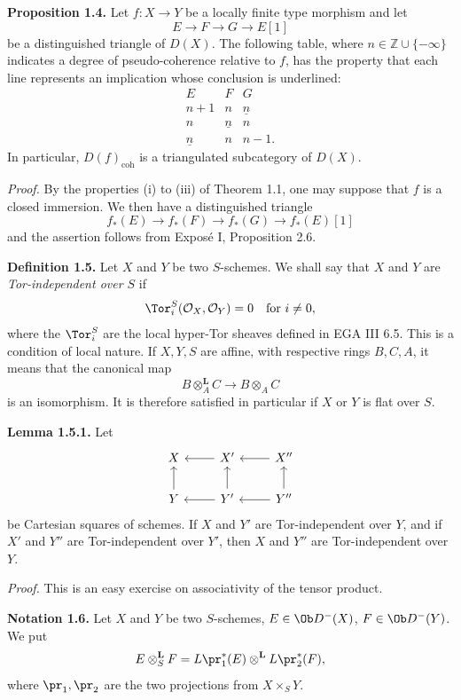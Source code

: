 \textbf{Proposition 1.4.} Let \(f:X\to Y\) be a locally finite type morphism and let
\[
E\longrightarrow F\longrightarrow G\longrightarrow E[1]
\]
be a distinguished triangle of \(D(X)\). The following table, where \(n\in \mathbb Z\cup\{-\infty\}\) indicates a degree of pseudo-coherence relative to \(f\), has the property that each line represents an implication whose conclusion is underlined:
\[
\begin{array}{ccc}
E&F&G\\
n+1&n&\underline n\\
n&\underline n&n\\
\underline n&n&n-1.
\end{array}
\]
In particular, \(D(f)_{\mathrm{coh}}\) is a triangulated subcategory of \(D(X)\).

\emph{Proof.} By the properties (i) to (iii) of Theorem 1.1, one may suppose that \(f\) is a closed immersion. We then have a distinguished triangle
\[
f_*(E)\longrightarrow f_*(F)\longrightarrow f_*(G)\longrightarrow f_*(E)[1]
\]
and the assertion follows from Exposé I, Proposition 2.6.

\textbf{Definition 1.5.} Let \(X\) and \(Y\) be two \(S\)-schemes. We shall say that \(X\) and \(Y\) are \emph{Tor-independent over \(S\)} if
\[
  \Tor_i^S(\mathcal O_X,\mathcal O_Y)=0\quad\text{for }i\ne 0,
\]
where the \(\Tor_i^S\) are the local hyper-Tor sheaves defined in EGA III 6.5. This is a condition of local nature. If \(X,Y,S\) are affine, with respective rings \(B,C,A\), it means that the canonical map
\[
  B\otimes_A^{\mathbf L}C\longrightarrow B\otimes_A C
\]
is an isomorphism. It is therefore satisfied in particular if \(X\) or \(Y\) is flat over \(S\).

\textbf{Lemma 1.5.1.} Let
\[
\begin{tikzcd}
X & X' \arrow[l] & X'' \arrow[l]\\
Y \arrow[u] & Y' \arrow[l] \arrow[u] & Y'' \arrow[l] \arrow[u]
\end{tikzcd}
\]
be Cartesian squares of schemes. If \(X\) and \(Y'\) are Tor-independent over \(Y\), and if \(X'\) and \(Y''\) are Tor-independent over \(Y'\), then \(X\) and \(Y''\) are Tor-independent over \(Y\).

\emph{Proof.} This is an easy exercise on associativity of the tensor product.

\textbf{Notation 1.6.} Let \(X\) and \(Y\) be two \(S\)-schemes, \(E\in \Ob D^{-}(X)\), \(F\in \Ob D^{-}(Y)\). We put
\[
  E\otimes_S^{\mathbf L}F
  =
  L\pr_1^*(E)\otimes^{\mathbf L}L\pr_2^*(F),
\]
where \(\pr_1,\pr_2\) are the two projections from \(X\times_SY\).

